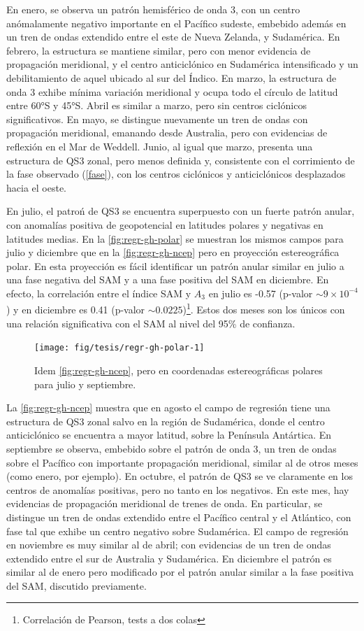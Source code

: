 \documentclass[spanish,a4paper,12pt,oneside]{book}
\let\rmarkdownfootnote\footnote%
\def\footnote{\protect\rmarkdownfootnote}
\begin{document}
En enero, se observa un patrón hemisférico de onda 3, con un centro
anómalamente negativo importante en el Pacífico sudeste, embebido además
en un tren de ondas extendido entre el este de Nueva Zelanda, y
Sudamérica. En febrero, la estructura se mantiene similar, pero con
menor evidencia de propagación meridional, y el centro anticiclónico en
Sudamérica intensificado y un debilitamiento de aquel ubicado al sur del
Índico. En marzo, la estructura de onda 3 exhibe mínima variación
meridional y ocupa todo el círculo de latitud entre 60°S y 45°S. Abril
es similar a marzo, pero sin centros ciclónicos significativos. En mayo,
se distingue nuevamente un tren de ondas con propagación meridional,
emanando desde Australia, pero con evidencias de reflexión en el Mar de
Weddell. Junio, al igual que marzo, presenta una estructura de QS3
zonal, pero menos definida y, consistente con el corrimiento de la fase
observado (\autoref{fase}), con los centros ciclónicos y anticiclónicos
desplazados hacia el oeste.

En julio, el patroń de QS3 se encuentra superpuesto con un fuerte patrón
anular, con anomalías positiva de geopotencial en latitudes polares y
negativas en latitudes medias. En la \autoref{fig:regr-gh-polar} se
muestran los mismos campos para julio y diciembre que en la
\autoref{fig:regr-gh-ncep} pero en proyección estereográfica polar. En
esta proyección es fácil identificar un patrón anular similar en julio a
una fase negativa del SAM y a una fase positiva del SAM en diciembre. En
efecto, la correlación entre el índice SAM y \(A_3\) en julio es -0.57
(p-valor \(\sim 9\times 10^{-4}\)) y en diciembre es 0.41 (p-valor
\(\sim 0.0225\))\footnote{Correlación de Pearson, tests a dos colas}.
Estos dos meses son los únicos con una relación significativa con el SAM
al nivel del 95\% de confianza.

\begin{figure}
\texttt{[image: fig/tesis/regr-gh-polar-1]} \caption{Idem \autoref{fig:regr-gh-ncep}, pero en coordenadas estereográficas polares para julio y septiembre.}\label{fig:regr-gh-polar}
\end{figure}

La \autoref{fig:regr-gh-ncep} muestra que en agosto el campo de
regresión tiene una estructura de QS3 zonal salvo en la región de
Sudamérica, donde el centro anticiclónico se encuentra a mayor latitud,
sobre la Península Antártica. En septiembre se observa, embebido sobre
el patrón de onda 3, un tren de ondas sobre el Pacífico con importante
propagación meridional, similar al de otros meses (como enero, por
ejemplo). En octubre, el patrón de QS3 se ve claramente en los centros
de anomalías positivas, pero no tanto en los negativos. En este mes, hay
evidencias de propagación meridional de trenes de onda. En particular,
se distingue un tren de ondas extendido entre el Pacífico central y el
Atlántico, con fase tal que exhibe un centro negativo sobre Sudamérica.
El campo de regresión en noviembre es muy similar al de abril; con
evidencias de un tren de ondas extendido entre el sur de Australia y
Sudamérica. En diciembre el patrón es similar al de enero pero
modificado por el patrón anular similar a la fase positiva del SAM,
discutido previamente.
\end{document}
